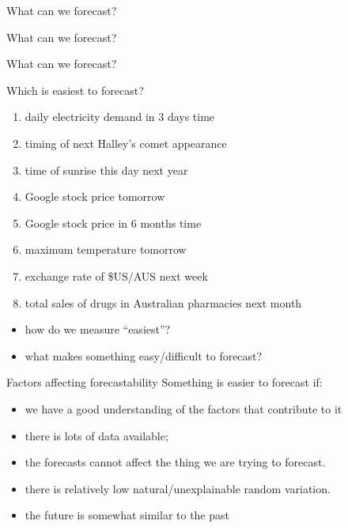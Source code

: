 \documentclass[
  14pt,
  ignorenonframetext,
  aspectratio=169,
]{beamer}
\providecommand{\tightlist}{%
  \setlength{\itemsep}{0pt}\setlength{\parskip}{0pt}}\usepackage{longtable,booktabs,array}
\begin{document}
\begin{frame}{What can we forecast?}
\protect\hypertarget{what-can-we-forecast-6}{}
\end{frame}

\begin{frame}{What can we forecast?}
\protect\hypertarget{what-can-we-forecast-7}{}
\end{frame}

\begin{frame}{What can we forecast?}
\protect\hypertarget{what-can-we-forecast-8}{}
\end{frame}

\begin{frame}{Which is easiest to forecast?}
\protect\hypertarget{which-is-easiest-to-forecast}{}
\begin{enumerate}
\tightlist
\item
  daily electricity demand in 3 days time
\item
  timing of next Halley's comet appearance
\item
  time of sunrise this day next year
\item
  Google stock price tomorrow
\item
  Google stock price in 6 months time
\item
  maximum temperature tomorrow
\item
  exchange rate of \$US/AUS next week
\item
  total sales of drugs in Australian pharmacies next month
\end{enumerate}

\pause

\begin{itemize}
\tightlist
\item
  how do we measure ``easiest''?
\item
  what makes something easy/difficult to forecast?
\end{itemize}
\end{frame}

\begin{frame}{Factors affecting forecastability}
\protect\hypertarget{factors-affecting-forecastability}{}
Something is easier to forecast if:

\begin{itemize}
\tightlist
\item
  we have a good understanding of the factors that contribute to it
\item
  there is lots of data available;
\item
  the forecasts cannot affect the thing we are trying to forecast.
\item
  there is relatively low natural/unexplainable random variation.
\item
  the future is somewhat similar to the past
\end{itemize}
\end{frame}
\end{document}
